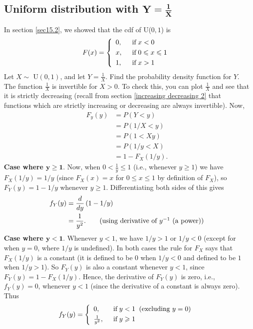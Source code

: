 \subsection{Uniform distribution with $\boldsymbol{Y = \frac{1}{X}}$}
In section \ref{sec15.2}, we showed that the cdf of U($0,1$) is
\[
F(x) = \left\{\begin{array}{ll}
0, & \;\; \text{if} \; x < 0 \smallskip \\
x, & \;\; \text{if} \; 0 \leq x \leq 1 \smallskip \\
1, & \;\; \text{if} \; x > 1
\end{array} \right.
\]
Let $X \sim$ U$(0,1)$, and let $Y = \frac{1}{X}$. Find the probability density function for $Y$. \\

\solution
The function $\frac{1}{X}$ is invertible for $X > 0$. To check this, you can plot $\frac{1}{X}$ and see that it is strictly decreasing (recall from section \ref{increasing decreasing 2} that functions which are strictly increasing or decreasing are always invertible). Now,
\begin{align*}
F_y(y) & = P(Y < y) \\
	 & = P(1/X < y) \tag{as $Y = 1/X$} \\
	 & = P(1 < Xy) \tag{since $X > 0$} \\
	 & = P(1/y < X) \tag{since $y > 0$} \\
	 & = 1 - F_X(1/y). \tag{since $P(X > x) = 1 - F_X(x)$}
\end{align*}
\textbf{Case where $\boldsymbol{y \geq 1}$}. Now, when $0 < \frac{1}{y} \leq 1$ (i.e., whenever $y \geq 1$) we have $F_X(1/y) = 1/y$ (since $F_X(x) = x$ for $0 \leq x \leq 1$ by definition of $F_X$), so $F_Y(y) = 1-1/y$ whenever $y \geq 1$. Differentiating both sides of this gives
\begin{align*}
f_Y(y) & = \frac{d}{dy}\brac{1-1/y} \\
	& = \frac{1}{y^2}.  \tag{using derivative of $y^{-1}$ (a power)}
\end{align*}
\textbf{Case where $\boldsymbol{y < 1}$}. Whenever $y < 1$, we have $1/y > 1$ or $1/y < 0$ (except for when $y = 0$, where $1/y$ is undefined). In both cases the rule for $F_X$ says that $F_X(1/y)$ is a constant (it is defined to be $0$ when $1/y < 0$ and defined to be $1$ when $1/y > 1$). So $F_Y(y)$ is also a constant whenever $y < 1$, since $F_Y(y) = 1 - F_X(1/y)$. Hence, the derivative of $F_Y(y)$ is zero, i.e., $f_Y(y) = 0$, whenever $y < 1$ (since the derivative of a constant is always zero). Thus
\[
f_Y(y) = \left\{\begin{array}{ll}
0, & \;\; \text{if} \; y < 1 \;\; (\text{excluding $y = 0$}) \smallskip \\
\frac{1}{y^2}, & \;\; \text{if} \; y \geq 1
\end{array} \right.
\]

